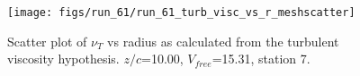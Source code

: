 \begin{figure}[H]
\centering
\texttt{[image: figs/run\_61/run\_61\_turb\_visc\_vs\_r\_meshscatter]}
\caption{Scatter plot of $\nu_T$ vs radius as calculated from the turbulent viscosity hypothesis. $z/c$=10.00, $V_{free}$=15.31, station 7.}
\label{fig:run_61_turb_visc_vs_r_meshscatter}
\end{figure}


